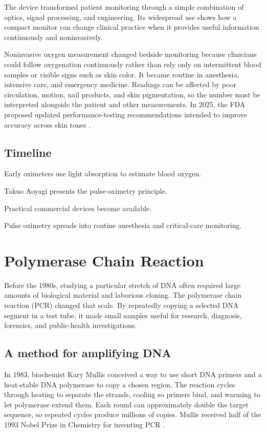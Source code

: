 \documentclass[12pt,oneside]{book}
\begin{document}
The device transformed patient monitoring through a simple combination of
optics, signal processing, and engineering. Its widespread use shows how a
compact monitor can change clinical practice when it provides useful
information continuously and noninvasively.

Noninvasive oxygen measurement changed bedside monitoring because clinicians
could follow oxygenation continuously rather than rely only on intermittent
blood samples or visible signs such as skin color. It became routine in
anesthesia, intensive care, and emergency medicine. Readings can be affected
by poor circulation, motion, nail products, and skin pigmentation, so the
number must be interpreted alongside the patient and other measurements. In
2025, the FDA proposed updated performance-testing recommendations intended to
improve accuracy across skin tones
\cite{pulseOximetryHistory,pulseOximetryTribute,fdaPulseOx2025}.

\section*{Timeline}
\begin{description}[leftmargin=2.3cm,style=nextline]
  \item[1930s--1940s] Early oximeters use light absorption to estimate blood oxygen.
  \item[1974] Takuo Aoyagi presents the pulse-oximetry principle.
  \item[Late 1970s--1980s] Practical commercial devices become available.
  \item[1980s onward] Pulse oximetry spreads into routine anesthesia and critical-care monitoring.
\end{description}
\chapter[Polymerase Chain Reaction]{Polymerase Chain Reaction}

Before the 1980s, studying a particular stretch of DNA often required large
amounts of biological material and laborious cloning. The polymerase chain
reaction (PCR) changed that scale. By repeatedly copying a selected DNA
segment in a test tube, it made small samples useful for research, diagnosis,
forensics, and public-health investigations.

\section{A method for amplifying DNA}
In 1983, biochemist Kary Mullis conceived a way to use short DNA primers and a
heat-stable DNA polymerase to copy a chosen region. The reaction cycles
through heating to separate the strands, cooling so primers bind, and warming
to let polymerase extend them. Each round can approximately double the target
sequence, so repeated cycles produce millions of copies. Mullis received half
of the 1993 Nobel Prize in Chemistry for inventing PCR
\cite{nobelPCR}.
\end{document}
